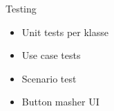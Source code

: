 \documentclass[mathserif,serif]{beamer}
\begin{document}
  \begin{frame}{Testing}
      \begin{center}
        \begin{itemize}
        \item Unit tests per klasse
        \item Use case tests
        \item Scenario test
        \item Button masher UI
        \end{itemize}
      \end{center}
  \end{frame} 

\end{document}
